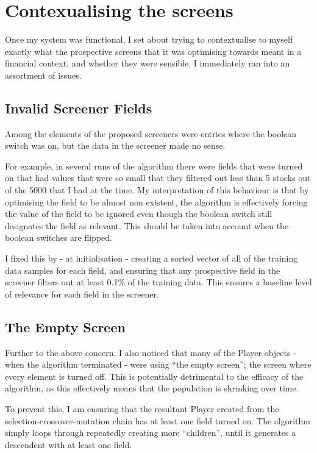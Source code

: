 \section{Contexualising the screens} \label{contextualising}
Once my system was functional, I set about trying to contextualise to myself exactly what the prospective screens that it was optimising towards meant in a financial context, and whether they were sensible. I immediately ran into an assortment of issues.

\subsection{Invalid Screener Fields} \label{invalidField}
Among the elements of the proposed screeners were entries where the boolean switch was on, but the data in the screener made no sense. \newline

For example, in several runs of the algorithm there were fields that were turned on that had values that were so small that they filtered out less than 5 stocks out of the 5000 that I had at the time. My interpretation of this behaviour is that by optimising the field to be almost non existent, the algorithm is effectively forcing the value of the field to be ignored even though the boolean switch still designates the field as relevant. This should be taken into account when the boolean switches are flipped. \newline

I fixed this by - at initialisation - creating a sorted vector of all of the training data samples for each field, and ensuring that any prospective field in the screener filters out at least 0.1\% of the training data. This ensures a baseline level of relevance for each field in the screener.

\subsection{The Empty Screen} \label{emptyScreen}
Further to the above concern, I also noticed that many of the Player objects - when the algorithm terminated - were using ``the empty screen''; the screen where every element is turned off. This is potentially detrimental to the efficacy of the algorithm, as this effectively means that the population is shrinking over time. \newline

To prevent this, I am ensuring that the resultant Player created from the selection-crossover-mutation chain has at least one field turned on. The algorithm simply loops through repeatedly creating more ``children'', until it generates a descendent with at least one field.

